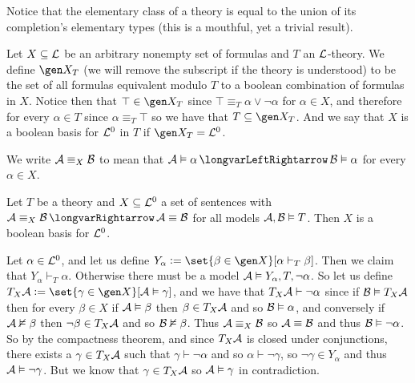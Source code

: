 \edefn

Notice that the elementary class of a theory is equal to the union of its completion's elementary types (this is a mouthful, yet a trivial result).

\bdefn

    Let $X\subseteq{\cal L}$ be an arbitrary nonempty set of formulas and $T$ an ${\cal L}$-theory.
    We define $\gen X_T$ (we will remove the subscript if the theory is understood) to be the set of all formulas equivalent modulo $T$ to a boolean combination of formulas in $X$.
    Notice then that $\top\in\gen X_T$ since $\top\equiv_T\alpha\lor\neg\alpha$ for $\alpha\in X$, and therefore for every $\alpha\in T$ since $\alpha\equiv_T\top$ so we have that $T\subseteq\gen X_T$.
    And we say that $X$ is a {\emphcolor boolean basis for ${\cal L}^0$ in $T$} if $\gen X_T={\cal L}^0$.

\edefn

We write ${\cal A}\equiv_X{\cal B}$ to mean that ${\cal A}\vDash\alpha\iff{\cal B}\vDash\alpha$ for every $\alpha\in X$.

\bthrm[title=Basis Theorem for Sentences, name=basistheorem]

    Let $T$ be a theory and $X\subseteq{\cal L}^0$ a set of sentences with ${\cal A}\equiv_X{\cal B}\implies{\cal A}\equiv{\cal B}$ for all models ${\cal A},{\cal B}\vDash T$.
    Then $X$ is a boolean basis for ${\cal L}^0$.

\ethrm

Let $\alpha\in{\cal L}^0$, and let us define $Y_\alpha\coloneqq\set{\beta\in\gen X}[\alpha\vdash_T\beta]$.
Then we claim that $Y_\alpha\vdash_T\alpha$.
Otherwise there must be a model ${\cal A}\vDash Y_\alpha,T,\neg\alpha$.
So let us define $T_X{\cal A}\coloneqq\set{\gamma\in\gen X}[{\cal A}\vDash\gamma]$, and we have that $T_X{\cal A}\vdash\neg\alpha$ since if ${\cal B}\vDash T_X{\cal A}$ then for every $\beta\in X$ if
${\cal A}\vDash\beta$ then $\beta\in T_X{\cal A}$ and so ${\cal B}\vDash\alpha$, and conversely if ${\cal A}\nvDash\beta$ then $\neg\beta\in T_X{\cal A}$ and so ${\cal B}\nvDash\beta$.
Thus ${\cal A}\equiv_X{\cal B}$ so ${\cal A}\equiv{\cal B}$ and thus ${\cal B}\vDash\neg\alpha$.
So by the compactness theorem, and since $T_X{\cal A}$ is closed under conjunctions, there exists a $\gamma\in T_X{\cal A}$ such that $\gamma\vdash\neg\alpha$ and so $\alpha\vdash\neg\gamma$, so
$\neg\gamma\in Y_\alpha$ and thus ${\cal A}\vDash\neg\gamma$.
But we know that $\gamma\in T_X{\cal A}$ so ${\cal A}\vDash\gamma$ in contradiction.

